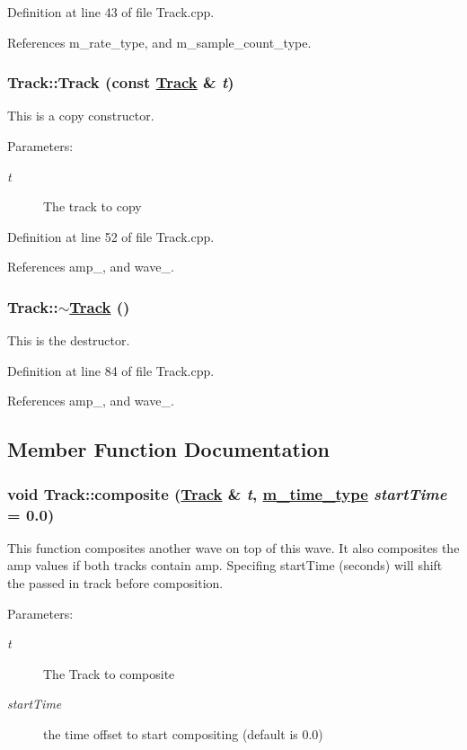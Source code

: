 Definition at line 43 of file Track.cpp.

References m\_\-rate\_\-type, and m\_\-sample\_\-count\_\-type.\hypertarget{classTrack_a2}{
\subsubsection[Track]{\setlength{\rightskip}{0pt plus 5cm}Track::Track (const \hyperlink{classTrack}{Track} \& {\em t})}}
\label{classTrack_a2}


This is a copy constructor. \begin{Desc}
\item[Parameters:]
\begin{description}
\item[{\em t}]The track to copy \end{description}
\end{Desc}


Definition at line 52 of file Track.cpp.

References amp\_\-, and wave\_\-.\hypertarget{classTrack_a4}{
\subsubsection[$\sim$Track]{\setlength{\rightskip}{0pt plus 5cm}Track::$\sim$\hyperlink{classTrack}{Track} ()}}
\label{classTrack_a4}


This is the destructor. 

Definition at line 84 of file Track.cpp.

References amp\_\-, and wave\_\-.

\subsection{Member Function Documentation}
\hypertarget{classTrack_a8}{
\subsubsection[composite]{\setlength{\rightskip}{0pt plus 5cm}void Track::composite (\hyperlink{classTrack}{Track} \& {\em t}, \hyperlink{Types_8h_a2}{m\_\-time\_\-type} {\em start\-Time} = 0.0)}}
\label{classTrack_a8}


This function composites another wave on top of this wave. It also composites the amp values if both tracks contain amp. Specifing start\-Time (seconds) will shift the passed in track before composition. \begin{Desc}
\item[Parameters:]
\begin{description}
\item[{\em t}]The Track to composite \item[{\em start\-Time}]the time offset to start compositing (default is 0.0) \end{description}
\end{Desc}


